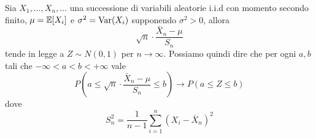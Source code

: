 \begin{proposition}\label{prop: tcl}
	Sia $X_1, \dots, X_n, \dots$ una successione di variabili aleatorie i.i.d con momento secondo
	finito, $\mu = \mathbb{E}[X_i]$ e $\sigma^2 = \operatorname{Var}(X_i)$ supponendo $\sigma^2 > 0$, allora
	\[ \sqrt{n} \cdot \frac{\bar{X}_n  - \mu}{S_n} \]
	tende in legge a $Z \sim N(0,1)$ per $n \to \infty$. Possiamo quindi dire che per ogni $a,b$
	tali che $-\infty < a < b < +\infty$ vale
	\[
		P \left( a \leq \sqrt{n} \cdot \frac{\bar{X}_n  - \mu}{S_n} \leq b \right) \to
		P(a \leq Z \leq b)
	\]
	dove
	\[ S_n^2 = \frac{1}{n-1} \sum_{i=1}^{n} (X_i - \bar{X}_n)^2 \]
\end{proposition}